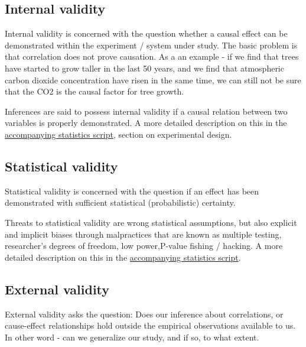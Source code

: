 \documentclass{tufte-book}
\begin{document}

\subsection{Internal validity}

Internal validity is concerned with the question whether a causal effect can be demonstrated within the experiment / system under study. The basic problem is that correlation does not prove causation. As a an example - if we find that trees have started to grow taller in the last 50 years, and we find that atmospheric carbon dioxide concentration have risen in the same time, we can still not be sure that the CO2 is the causal factor for tree growth. 

Inferences are said to possess internal validity if a causal relation between two variables is properly demonstrated. A more detailed description on this in the \href{https://github.com/florianhartig/ResearchSkills/raw/master/Labs/Statistics/Script/EssentialStatistics.pdf}{accompanying statistics script}, section on experimental design.


\subsection{Statistical validity}

Statistical validity is concerned with the question if an effect has been demonstrated with sufficient statistical (probabilistic) certainty. 

Threats to statistical validity are wrong statistical assumptions, but also explicit and implicit biases through malpractices that are known as multiple testing, researcher’s degrees of freedom, low power,P-value fishing / hacking. A more detailed description on this in the \href{https://github.com/florianhartig/ResearchSkills/raw/master/Labs/Statistics/Script/EssentialStatistics.pdf}{accompanying statistics script}. 

\subsection{External validity}

External validity asks the question: Does our inference about correlations, or cause-effect relationships hold outside the empirical observations available to us. In other word - can we generalize our study, and if so, to what extent. 
\end{document}
